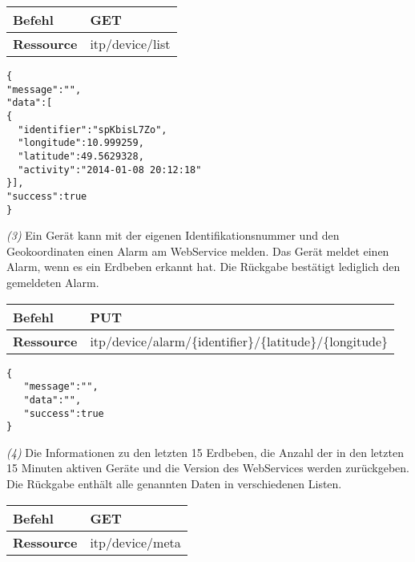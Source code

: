 \begin{table}[!htb] 
    \begin{tabular}{l|l}
    \textbf{Befehl}    & GET                                          \\ \hline
    \textbf{Ressource} & itp/device/list \\ 
    \end{tabular}
\end{table}

\begin{lstlisting}[caption={Rückgabe}]
{
"message":"",
"data":[
{        
  "identifier":"spKbisL7Zo",
  "longitude":10.999259,
  "latitude":49.5629328,
  "activity":"2014-01-08 20:12:18"
}],
"success":true
}
\end{lstlisting} 

\textit{(3)} Ein Gerät kann mit der eigenen Identifikationsnummer und den Geokoordinaten einen Alarm am WebService melden. Das Gerät meldet einen Alarm, wenn es ein Erdbeben erkannt hat. Die Rückgabe bestätigt lediglich den gemeldeten Alarm.

\begin{table}[!htb] 
    \begin{tabular}{l|l}
    \textbf{Befehl}    & PUT                                          \\ \hline
    \textbf{Ressource} & itp/device/alarm/\{identifier\}/\{latitude\}/\{longitude\} \\ 
    \end{tabular}
\end{table}

\begin{lstlisting}[caption={Rückgabe}]
{
   "message":"",
   "data":"",
   "success":true
}
\end{lstlisting} 


\textit{(4)} Die Informationen zu den letzten 15 Erdbeben, die Anzahl der in den letzten 15 Minuten aktiven Geräte und die Version des WebServices werden zurückgeben. Die Rückgabe enthält alle genannten Daten in verschiedenen Listen.

\begin{table}[!htb] 
    \begin{tabular}{l|l}
    \textbf{Befehl}    & GET                                          \\ \hline
    \textbf{Ressource} & itp/device/meta \\ 
    \end{tabular}
\end{table}

